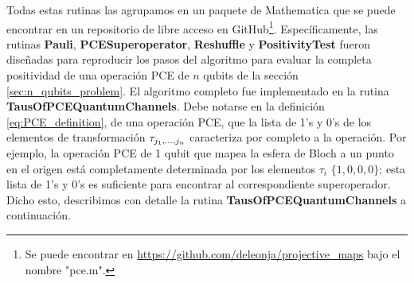 Todas estas rutinas las agrupamos en un paquete de Mathematica
que se puede encontrar en un repositorio de libre acceso en 
GitHub\footnote{Se puede encontrar en 
\href{https://github.com/deleonja/projective_maps}
{https://github.com/deleonja/projective\_maps} bajo 
el nombre "pce.m".}. Específicamente, las rutinas 
\textbf{Pauli}, \textbf{PCESuperoperator}, \textbf{Reshuffle} y 
\textbf{PositivityTest} fueron diseñadas para reproducir los pasos 
del algoritmo para evaluar la completa positividad de una operación 
PCE de $n$ qubits de la sección \ref{sec:n_qubits_problem}.
El algoritmo completo fue implementado en la rutina 
\textbf{TausOfPCEQuantumChannels}. Debe notarse en la definición 
\eqref{eq:PCE_definition}, de una operación PCE, que la lista de
1's y 0's de los elementos de transformación $\tau_{j_1,\ldots ,j_n}$ caracteriza 
por completo a la operación. Por ejemplo, la operación PCE de 1 qubit 
que mapea la esfera de Bloch a un punto en el origen
está completamente determinada por 
los elementos $\tau_i$ $\{1,0,0,0\}$; esta lista de 
1's y 0's es suficiente para encontrar al correspondiente superoperador.
Dicho esto, describimos con detalle la rutina 
\textbf{TausOfPCEQuantumChannels} a continuación.

%

